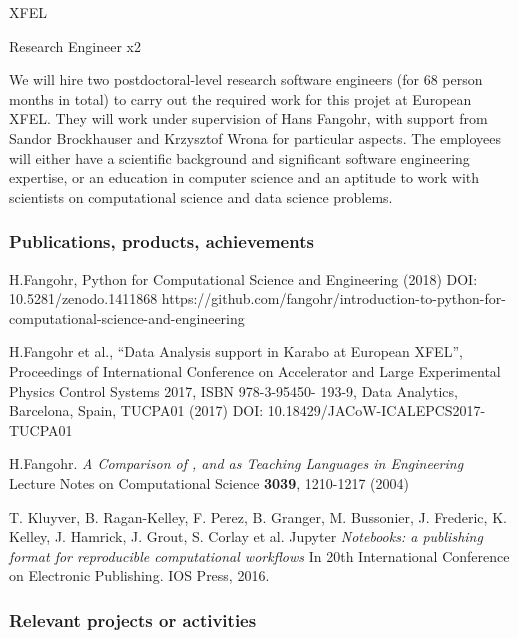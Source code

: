 \begin{sitedescription}{XFEL}
\begin{participant}[PM=68, type=R]{Research Engineer x2}

We will hire two postdoctoral-level research software engineers (for 68 person
months in total) to carry out the required work for this projet at
European XFEL. They will work under supervision of Hans Fangohr, with
support from Sandor Brockhauser and Krzysztof Wrona for particular
aspects. The employees will either have a scientific background and
significant software engineering expertise, or an education in
computer science and an aptitude to work with scientists on
computational science and data science problems.
\end{participant}

\subsubsection*{Publications, products, achievements}

\begin{compactenum}
\item H.Fangohr, Python for Computational Science and Engineering
  (2018) DOI: 10.5281/zenodo.1411868 \newline
  https://github.com/fangohr/introduction-to-python-for-computational-science-and-engineering
\item H.Fangohr et al., “Data Analysis support in Karabo at European
  XFEL”, Proceedings of International Conference on Accelerator and
  Large Experimental Physics Control Systems 2017, ISBN 978-3-95450-
  193-9, Data Analytics, Barcelona, Spain, TUCPA01 (2017) DOI: 10.18429/JACoW-ICALEPCS2017-TUCPA01
\item H.Fangohr.
\emph{A Comparison of , \Matlab and \Python as Teaching Languages in Engineering}
Lecture Notes on Computational Science \textbf{3039}, 1210-1217 (2004)
\item T. Kluyver, B. Ragan-Kelley, F. Perez, B. Granger, M. Bussonier, J. Frederic, K. Kelley, J. Hamrick, J. Grout, S. Corlay et al. Jupyter
\emph{Notebooks: a publishing format for reproducible computational workflows} In 20th International Conference on Electronic Publishing. IOS Press, 2016.
\end{compactenum}

\subsubsection*{Relevant projects or activities}


\end{sitedescription}
